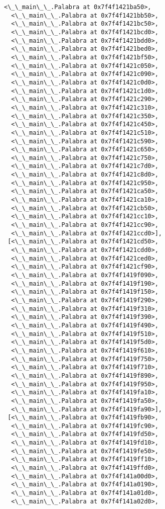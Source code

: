 \documentclass[12pt,a4paper,table]{article}
\begin{document}
\begin{tcolorbox}[breakable, size=fbox, boxrule=.5pt, pad at break*=1mm, opacityfill=0]
\begin{Verbatim}[commandchars=\\\{\}]
  <\_\_main\_\_.Palabra at 0x7f4f1421ba50>,
  <\_\_main\_\_.Palabra at 0x7f4f1421bb50>,
  <\_\_main\_\_.Palabra at 0x7f4f1421bc50>,
  <\_\_main\_\_.Palabra at 0x7f4f1421bcd0>,
  <\_\_main\_\_.Palabra at 0x7f4f1421bdd0>,
  <\_\_main\_\_.Palabra at 0x7f4f1421bed0>,
  <\_\_main\_\_.Palabra at 0x7f4f1421bf50>,
  <\_\_main\_\_.Palabra at 0x7f4f1421c050>,
  <\_\_main\_\_.Palabra at 0x7f4f1421c090>,
  <\_\_main\_\_.Palabra at 0x7f4f1421c0d0>,
  <\_\_main\_\_.Palabra at 0x7f4f1421c1d0>,
  <\_\_main\_\_.Palabra at 0x7f4f1421c290>,
  <\_\_main\_\_.Palabra at 0x7f4f1421c310>,
  <\_\_main\_\_.Palabra at 0x7f4f1421c350>,
  <\_\_main\_\_.Palabra at 0x7f4f1421c450>,
  <\_\_main\_\_.Palabra at 0x7f4f1421c510>,
  <\_\_main\_\_.Palabra at 0x7f4f1421c590>,
  <\_\_main\_\_.Palabra at 0x7f4f1421c650>,
  <\_\_main\_\_.Palabra at 0x7f4f1421c750>,
  <\_\_main\_\_.Palabra at 0x7f4f1421c7d0>,
  <\_\_main\_\_.Palabra at 0x7f4f1421c8d0>,
  <\_\_main\_\_.Palabra at 0x7f4f1421c950>,
  <\_\_main\_\_.Palabra at 0x7f4f1421ca50>,
  <\_\_main\_\_.Palabra at 0x7f4f1421ca10>,
  <\_\_main\_\_.Palabra at 0x7f4f1421cb50>,
  <\_\_main\_\_.Palabra at 0x7f4f1421cc10>,
  <\_\_main\_\_.Palabra at 0x7f4f1421cc90>,
  <\_\_main\_\_.Palabra at 0x7f4f1421ccd0>],
 [<\_\_main\_\_.Palabra at 0x7f4f1421cd50>,
  <\_\_main\_\_.Palabra at 0x7f4f1421cdd0>,
  <\_\_main\_\_.Palabra at 0x7f4f1421ced0>,
  <\_\_main\_\_.Palabra at 0x7f4f1421cf90>,
  <\_\_main\_\_.Palabra at 0x7f4f1419f090>,
  <\_\_main\_\_.Palabra at 0x7f4f1419f190>,
  <\_\_main\_\_.Palabra at 0x7f4f1419f150>,
  <\_\_main\_\_.Palabra at 0x7f4f1419f290>,
  <\_\_main\_\_.Palabra at 0x7f4f1419f310>,
  <\_\_main\_\_.Palabra at 0x7f4f1419f390>,
  <\_\_main\_\_.Palabra at 0x7f4f1419f490>,
  <\_\_main\_\_.Palabra at 0x7f4f1419f510>,
  <\_\_main\_\_.Palabra at 0x7f4f1419f5d0>,
  <\_\_main\_\_.Palabra at 0x7f4f1419f610>,
  <\_\_main\_\_.Palabra at 0x7f4f1419f750>,
  <\_\_main\_\_.Palabra at 0x7f4f1419f710>,
  <\_\_main\_\_.Palabra at 0x7f4f1419f890>,
  <\_\_main\_\_.Palabra at 0x7f4f1419f950>,
  <\_\_main\_\_.Palabra at 0x7f4f1419fa10>,
  <\_\_main\_\_.Palabra at 0x7f4f1419fa50>,
  <\_\_main\_\_.Palabra at 0x7f4f1419fa90>],
 [<\_\_main\_\_.Palabra at 0x7f4f1419fb90>,
  <\_\_main\_\_.Palabra at 0x7f4f1419fc90>,
  <\_\_main\_\_.Palabra at 0x7f4f1419fd50>,
  <\_\_main\_\_.Palabra at 0x7f4f1419fd10>,
  <\_\_main\_\_.Palabra at 0x7f4f1419fe50>,
  <\_\_main\_\_.Palabra at 0x7f4f1419ff10>,
  <\_\_main\_\_.Palabra at 0x7f4f1419ffd0>,
  <\_\_main\_\_.Palabra at 0x7f4f141a00d0>,
  <\_\_main\_\_.Palabra at 0x7f4f141a0190>,
  <\_\_main\_\_.Palabra at 0x7f4f141a01d0>,
  <\_\_main\_\_.Palabra at 0x7f4f141a02d0>,

\end{Verbatim}
\end{tcolorbox}
\end{document}
